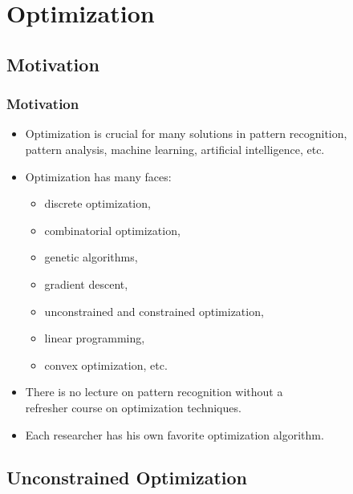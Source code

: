 \section{Optimization}

\subsection{Motivation}

\begin{frame}
  \frametitle{Motivation}

  \begin{itemize}
    \item Optimization is crucial for many solutions in pattern recognition, \\
      pattern analysis, machine learning, artificial intelligence, etc. \\[.25cm]
    \item Optimization has many faces: 
      \begin{itemize}
        \item discrete optimization,
        \item combinatorial optimization,
        \item genetic algorithms,
        \item gradient descent,
        \item unconstrained and constrained optimization,
        \item linear programming,
        \item convex optimization, etc. \\[.25cm]
      \end{itemize}
    \item There is no lecture on pattern recognition without a \\
      refresher course on optimization techniques. \\[.25cm]
    \item Each researcher has his own favorite optimization algorithm.
  \end{itemize}
\end{frame}


\subsection{Unconstrained Optimization}


